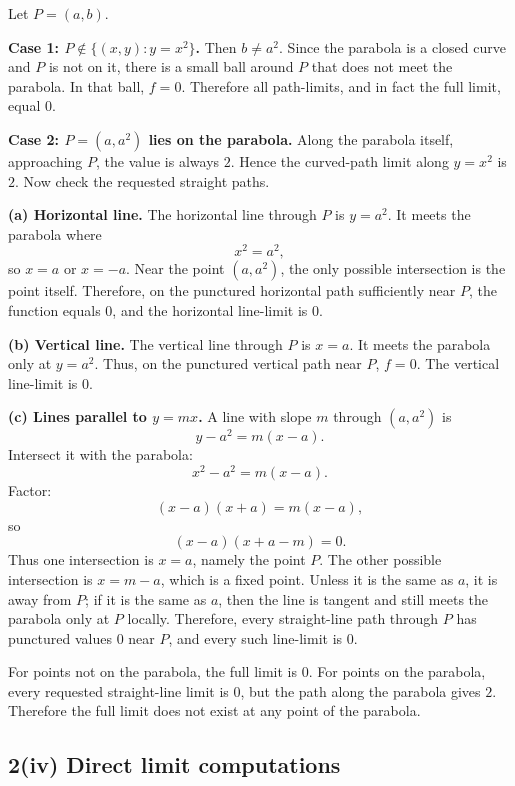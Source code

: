 \documentclass[11pt]{article}
\begin{document}
Let \(P=(a,b)\).

\textbf{Case 1: \(P\notin\{(x,y):y=x^2\}\).} Then \(b\neq a^2\). Since the parabola is a closed curve and \(P\) is not on it, there is a small ball around \(P\) that does not meet the parabola. In that ball, \(f=0\). Therefore all path-limits, and in fact the full limit, equal \(0\).

\textbf{Case 2: \(P=(a,a^2)\) lies on the parabola.} Along the parabola itself, approaching \(P\), the value is always \(2\). Hence the curved-path limit along \(y=x^2\) is \(2\). Now check the requested straight paths.

\textbf{(a) Horizontal line.} The horizontal line through \(P\) is \(y=a^2\). It meets the parabola where
\[
x^2=a^2,
\]
so \(x=a\) or \(x=-a\). Near the point \((a,a^2)\), the only possible intersection is the point itself. Therefore, on the punctured horizontal path sufficiently near \(P\), the function equals \(0\), and the horizontal line-limit is \(0\).

\textbf{(b) Vertical line.} The vertical line through \(P\) is \(x=a\). It meets the parabola only at \(y=a^2\). Thus, on the punctured vertical path near \(P\), \(f=0\). The vertical line-limit is \(0\).

\textbf{(c) Lines parallel to \(y=mx\).} A line with slope \(m\) through \((a,a^2)\) is
\[
y-a^2=m(x-a).
\]
Intersect it with the parabola:
\[
x^2-a^2=m(x-a).
\]
Factor:
\[
(x-a)(x+a)=m(x-a),
\]
so
\[
(x-a)(x+a-m)=0.
\]
Thus one intersection is \(x=a\), namely the point \(P\). The other possible intersection is \(x=m-a\), which is a fixed point. Unless it is the same as \(a\), it is away from \(P\); if it is the same as \(a\), then the line is tangent and still meets the parabola only at \(P\) locally. Therefore, every straight-line path through \(P\) has punctured values \(0\) near \(P\), and every such line-limit is \(0\).

\begin{answerbox}
For points not on the parabola, the full limit is \(0\). For points on the parabola, every requested straight-line limit is \(0\), but the path along the parabola gives \(2\). Therefore the full limit does not exist at any point of the parabola.
\end{answerbox}

\subsection{2(iv) Direct limit computations}
\end{document}
